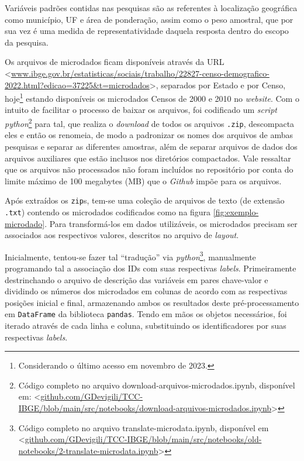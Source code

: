     Variáveis padrões contidas nas pesquisas são as referentes à localização geográfica como município, UF e área de ponderação, assim como o peso amostral, que por sua vez é uma medida de representatividade daquela resposta dentro do escopo da pesquisa.

    Os arquivos de microdados ficam disponíveis através da URL <\url{www.ibge.gov.br/estatisticas/sociais/trabalho/22827-censo-demografico-2022.html?edicao=37225&t=microdados}>, separados por Estado e por Censo, hoje\footnote{Considerando o último acesso em novembro de 2023.} estando disponíveis os microdados Censos de 2000 e 2010 no \textit{website}. Com o intuito de facilitar o processo de baixar os arquivos, foi codificado um \textit{script python}\footnote{Código completo no arquivo download-arquivos-microdados.ipynb, disponível em: <\url{github.com/GDevigili/TCC-IBGE/blob/main/src/notebooks/download-arquivos-microdados.ipynb}>} para tal, que realiza o \textit{download} de todos os arquivos \verb|.zip|, descompacta eles e então os renomeia, de modo a padronizar os nomes dos arquivos de ambas pesquisas e separar as diferentes amostras, além de separar arquivos de dados dos arquivos auxiliares que estão inclusos nos diretórios compactados. Vale ressaltar que os arquivos não processados não foram incluídos no repositório por conta do limite máximo de 100 megabytes (MB) que o \textit{Github} impõe para os arquivos.

    Após extraídos os \verb|zip|s, tem-se uma coleção de arquivos de texto (de extensão \verb|.txt|) contendo os microdados codificados como na figura \ref{fig:exemplo-microdado}. Para transformá-los em dados utilizáveis, os microdados precisam ser associados aos respectivos valores, descritos no arquivo de \textit{layout}.

    Inicialmente, tentou-se fazer tal ``tradução'' via \textit{python}\footnote{Código completo no arquivo translate-microdata.ipynb, disponível em <\url{github.com/GDevigili/TCC-IBGE/blob/main/src/notebooks/old-notebooks/2-translate-microdata.ipynb}>}, manualmente programando tal a associação dos IDs com suas respectivas \textit{labels}. Primeiramente destrinchando o arquivo de descrição das variáveis em pares chave-valor e dividindo os números dos microdados em colunas de acordo com as respectivas posições inicial e final, armazenando ambos os resultados deste pré-processamento em \verb|DataFrame| da biblioteca \verb|pandas|. Tendo em mãos os objetos necessários, foi iterado através de cada linha e coluna, substituindo os identificadores por suas respectivas \textit{labels}.

